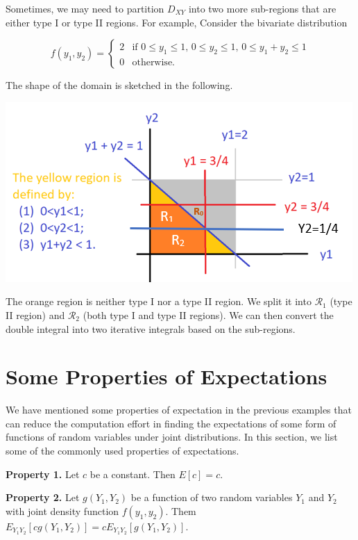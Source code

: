\documentclass[
]{book}
\begin{document}
\hfill\break

Sometimes, we may need to partition \(D_{XY}\) into two more sub-regions that are either type I or type II regions. For example, Consider the bivariate distribution

\[
\displaystyle f(y_1, y_2) = \begin{cases} 
 2 & \text{if $0 \le y_1 \le 1$, $0 \le y_2 \le 1$, $0 \le y_1 +y_2 \le 1$}\\  
 0 & \text{otherwise}.
 \end{cases}
\]

The shape of the domain is sketched in the following.

\begin{center}\includegraphics[width=0.5\linewidth]{topic06/example08IntegralRegion} \end{center}

The orange region is neither type I nor a type II region. We split it into \(\mathcal{R}_1\) (type II region) and \(\mathcal{R}_2\) (both type I and type II regions). We can then convert the double integral into two iterative integrals based on the sub-regions.

\hfill\break

\hypertarget{some-properties-of-expectations}{%
\section{Some Properties of Expectations}\label{some-properties-of-expectations}}

We have mentioned some properties of expectation in the previous examples that can reduce the computation effort in finding the expectations of some form of functions of random variables under joint distributions. In this section, we list some of the commonly used properties of expectations.

\textbf{Property 1.} Let \(c\) be a constant. Then \(E[c] = c.\)

\textbf{Property 2.} Let \(g(Y_1, Y_2)\) be a function of two random variables \(Y_1\) and \(Y_2\) with joint density function \(f(y_1, y_2)\). Them \(E_{Y_1Y_2}[cg(Y_1, Y_2)] = c E_{Y_1Y_2}[g(Y_1,Y_2)]\).
\end{document}
